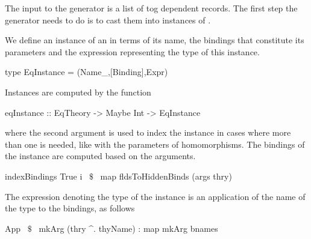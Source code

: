 The input to the generator is a list of tog dependent records. The first step the generator needs to do is to cast them into instances of . 
\begin{comment}
This is done using the function \lstmath{recordToEqTheory}. 
\begin{hscode}
recordToEqTheory :: TRecord -> Eq.EqTheory
recordToEqTheory record@(TRecord nm params _) =
  Eq.build (nm^.name) 
    (getRecordSort record)
    (getRecordComps isFunc record)
    (getRecordComps isAxiom record)
    (paramsNum params)
\end{hscode}
In tog, records definitions are declared using the \lstmath{Record} constructor of the type \lstmath{Decl}, which contains many other constructors used to define functions, types, and others. We prefer to use a type dedicated to records, and therefore use the \lstmath{TRecord} type instead. \lstmath{TRecord} has the exact same parameters as the \lstmath{Record} constructor. 
\end{comment}

We define an instance of an  in terms of its name, the bindings that constitute its parameters and the expression representing the type of this instance. 
\begin{hscode}
 type EqInstance = (Name_,[Binding],Expr) 
\end{hscode}
Instances are computed by the function 
\begin{hscode} 
eqInstance :: EqTheory -> Maybe Int -> EqInstance
\end{hscode}
where the second argument is used to index the instance in cases where more than one is needed, like with the parameters of homomorphisms. The bindings of the instance are computed based on the arguments. 
\begin{hscode}
 indexBindings True i ~$\$$~ map fldsToHiddenBinds (args thry)
\end{hscode}
The expression denoting the type of the instance is an application of the name of the type to the bindings, as follows 
\begin{hscode}
App ~$\$$~ mkArg (thry ^. thyName) : map mkArg bnames
\end{hscode} 

